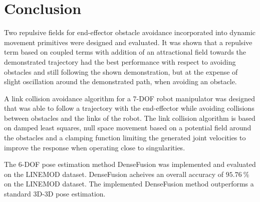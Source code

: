 \documentclass[../main.tex]{subfiles}
\begin{document}
\section{Conclusion}
\label{sec:conclusion}

Two repulsive fields for end-effector obstacle avoidance incorporated into dynamic movement primitives were designed and evaluated. It was shown that a repulsive term based on coupled terms with addition of an attractional field towards the demonstrated trajectory had the best performance with respect to avoiding obstacles and still following the shown demonstration, but at the expense of slight oscillation around the demonstrated path, when avoiding an obstacle.

A link collision avoidance algorithm for a 7-DOF robot manipulator was designed that was able to follow a trajectory with the end-effector while avoiding collisions between obstacles and the links of the robot. The link collision algorithm is based on damped least squares, null space movement based on a potential field around the obstacles and a clamping function limiting the generated joint velocities to improve the response when operating close to singularities.

The 6-DOF pose estimation method DenseFusion was implemented and evaluated on the LINEMOD dataset. DenseFusion acheives an overall accuracy of $95.76\ \%$ on the LINEMOD dataset. The implemented DenseFusion method outperforms a standard 3D-3D pose estimation.
\end{document}
